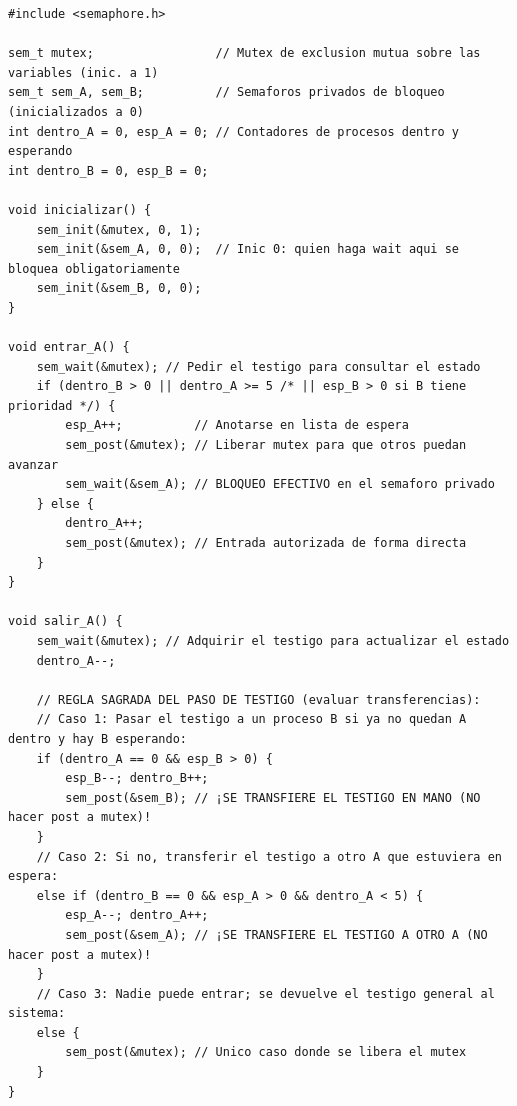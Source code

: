 \documentclass[11pt,a4paper]{article}
\begin{document}
\begin{lstlisting}
#include <semaphore.h>

sem_t mutex;                 // Mutex de exclusion mutua sobre las variables (inic. a 1)
sem_t sem_A, sem_B;          // Semaforos privados de bloqueo (inicializados a 0)
int dentro_A = 0, esp_A = 0; // Contadores de procesos dentro y esperando
int dentro_B = 0, esp_B = 0;

void inicializar() {
    sem_init(&mutex, 0, 1);
    sem_init(&sem_A, 0, 0);  // Inic 0: quien haga wait aqui se bloquea obligatoriamente
    sem_init(&sem_B, 0, 0);
}

void entrar_A() {
    sem_wait(&mutex); // Pedir el testigo para consultar el estado
    if (dentro_B > 0 || dentro_A >= 5 /* || esp_B > 0 si B tiene prioridad */) {
        esp_A++;          // Anotarse en lista de espera
        sem_post(&mutex); // Liberar mutex para que otros puedan avanzar
        sem_wait(&sem_A); // BLOQUEO EFECTIVO en el semaforo privado
    } else {
        dentro_A++;
        sem_post(&mutex); // Entrada autorizada de forma directa
    }
}

void salir_A() {
    sem_wait(&mutex); // Adquirir el testigo para actualizar el estado
    dentro_A--;

    // REGLA SAGRADA DEL PASO DE TESTIGO (evaluar transferencias):
    // Caso 1: Pasar el testigo a un proceso B si ya no quedan A dentro y hay B esperando:
    if (dentro_A == 0 && esp_B > 0) {
        esp_B--; dentro_B++;
        sem_post(&sem_B); // ¡SE TRANSFIERE EL TESTIGO EN MANO (NO hacer post a mutex)!
    }
    // Caso 2: Si no, transferir el testigo a otro A que estuviera en espera:
    else if (dentro_B == 0 && esp_A > 0 && dentro_A < 5) {
        esp_A--; dentro_A++;
        sem_post(&sem_A); // ¡SE TRANSFIERE EL TESTIGO A OTRO A (NO hacer post a mutex)!
    }
    // Caso 3: Nadie puede entrar; se devuelve el testigo general al sistema:
    else {
        sem_post(&mutex); // Unico caso donde se libera el mutex
    }
}
\end{lstlisting}

\vspace{-0.15cm}
\end{document}
